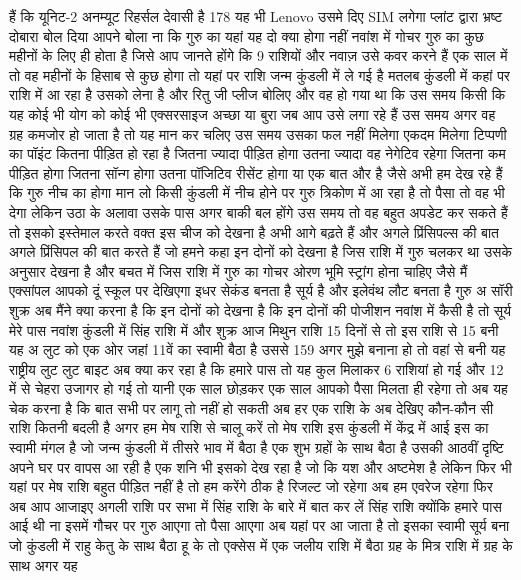 हैं कि यूनिट-2 अनम्यूट रिहर्सल देवासी है 178 यह भी Lenovo उसमे दिए SIM लगेगा
प्लांट द्वारा भ्रष्ट दोबारा बोल दिया आपने बोला ना कि गुरु का यहां यह दो
क्या होगा नहीं नवांश में गोचर गुरु का कुछ महीनों के लिए ही होता है जिसे आप
जानते होंगे कि 9 राशियों और नवाज़ उसे कवर करने हैं एक साल में तो वह महीनों के हिसाब से कुछ होगा तो यहां पर राशि जन्म
कुंडली में ले गई है मतलब कुंडली में कहां पर राशि में आ रहा है उसको लेना है और
रितु जी प्लीज बोलिए और वह हो गया था
कि उस समय किसी कि यह कोई भी योग को कोई भी एक्सरसाइज अच्छा या बुरा जब आप उसे लगा रहे हैं उस
समय अगर वह ग्रह कमजोर हो जाता है तो यह मान कर चलिए उस समय उसका फल नहीं मिलेगा एकदम मिलेगा टिप्पणी का पॉइंट कितना
पीड़ित हो रहा है जितना ज्यादा पीड़ित होगा उतना ज्यादा वह नेगेटिव रहेगा जितना
कम पीड़ित होगा जितना सॉन्ग होगा उतना पॉजिटिव रीसेंट होगा या एक बात और है जैसे अभी हम देख रहे हैं कि गुरु नीच का होगा मान लो किसी कुंडली में नीच होने पर गुरु
त्रिकोण में आ रहा है तो पैसा तो वह भी देगा लेकिन उठा के अलावा उसके पास अगर बाकी बल होंगे उस समय तो वह बहुत अपडेट कर
सकते हैं तो इसको इस्तेमाल करते वक्त इस चीज को देखना है अभी आगे बढ़ते हैं और
अगले प्रिंसिपल्स की बात अगले प्रिंसिपल की बात करते हैं जो हमने कहा इन दोनों को देखना है जिस
राशि में गुरु चलकर था उसके अनुसार देखना है और बचत में जिस राशि में गुरु का गोचर
ओरण भूमि स्ट्रांग होना चाहिए जैसे मैं एक्सांपल आपको दूं स्कूल पर देखिएगा इधर
सेकंड बनता है सूर्य है और इलेवंथ लौट बनता है गुरु अ सॉरी
शुक्र अब मैंने क्या करना है कि इन दोनों को देखना है कि इन दोनों की पोजीशन नवांश
में कैसी है तो सूर्य मेरे पास नवांश कुंडली में सिंह राशि में और शुक्र आज
मिथुन राशि 15 दिनों से तो इस राशि से 15
बनी यह अ लुट को एक ओर जहां 11वें का स्वामी बैठा है
उससे 159 अगर मुझे बनाना हो तो वहां से बनी यह राष्ट्रीय
लुट लुट बाइट अब क्या कर रहा है कि हमारे पास तो यह कुल मिलाकर 6 राशियां हो गई और 12
में से चेहरा उजागर हो गई तो यानी एक साल छोड़कर एक साल आपको पैसा मिलता ही रहेगा तो अब यह चेक करना है कि बात सभी पर लागू
तो नहीं हो सकती अब हर एक राशि के अब देखिए कौन-कौन सी राशि कितनी बदली है अगर हम मेष राशि से चालू करें तो मेष राशि इस
कुंडली में केंद्र में आई इस का स्वामी मंगल है जो जन्म कुंडली में तीसरे भाव में
बैठा है एक शुभ ग्रहों के साथ बैठा है उसकी आठवीं दृष्टि अपने घर पर वापस आ रही
है एक शनि भी इसको देख रहा है जो कि यश और अष्टमेश है लेकिन फिर भी यहां पर मेष राशि
बहुत पीड़ित नहीं है तो हम करेंगे ठीक है रिजल्ट जो रहेगा अब हम एवरेज रहेगा फिर अब आप आजाइए अगली राशि पर सभा में सिंह राशि
के बारे में बात कर लें सिंह राशि क्योंकि हमारे पास आई थी ना इसमें गौचर पर गुरु आएगा तो पैसा आएगा अब यहां पर
आ जाता है तो इसका स्वामी सूर्य बना जो कुंडली में राहु केतु के साथ बैठा हू के
तो एक्सेस में एक जलीय राशि में बैठा ग्रह के मित्र राशि में ग्रह के साथ अगर यह
